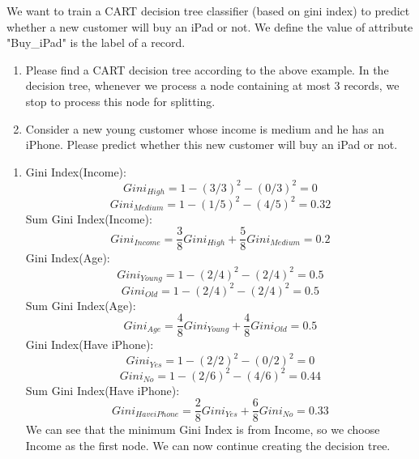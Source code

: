 \documentclass{article}
\begin{document}
We want to train a CART decision tree classifier (based on gini index) to predict whether a new customer will buy an iPad or not. We define the value of attribute "Buy\_iPad" is the label of a record.

\begin{enumerate}[label=(\roman*)]
    \item Please find a CART decision tree according to the above example. In the decision tree, whenever we process a node containing at most 3 records, we stop to process this node for splitting.
    \item Consider a new young customer whose income is medium and he has an iPhone. Please predict whether this new customer will buy an iPad or not.
\end{enumerate}

\begin{enumerate}[label=(\roman*)]
    \item 
    Gini Index(Income):
    \begin{equation}
        Gini_{High} = 1 - (3/3)^2 - (0/3)^2 = 0
    \end{equation}
    \begin{equation}
        Gini_{Medium} = 1 - (1/5)^2 - (4/5)^2 = 0.32
    \end{equation}
    Sum Gini Index(Income):
    \begin{equation}
        Gini_{Income} = \frac{3}{8}Gini_{High} + \frac{5}{8}Gini_{Medium} = 0.2
    \end{equation}
    Gini Index(Age):
    \begin{equation}
        Gini_{Young} = 1 - (2/4)^2 - (2/4)^2 = 0.5
    \end{equation}
    \begin{equation}
        Gini_{Old} = 1 - (2/4)^2 - (2/4)^2 = 0.5
    \end{equation}
    Sum Gini Index(Age):
    \begin{equation}
        Gini_{Age} = \frac{4}{8}Gini_{Young} + \frac{4}{8}Gini_{Old} = 0.5
    \end{equation}
    Gini Index(Have iPhone):
    \begin{equation}
        Gini_{Yes} = 1 - (2/2)^2 - (0/2)^2 = 0
    \end{equation}
    \begin{equation}
        Gini_{No} = 1 - (2/6)^2 - (4/6)^2 = 0.44
    \end{equation}
    Sum Gini Index(Have iPhone):
    \begin{equation}
        Gini_{Have iPhone} = \frac{2}{8}Gini_{Yes} + \frac{6}{8}Gini_{No} = 0.33
    \end{equation}
    We can see that the minimum Gini Index is from Income, so we choose Income as the first node. We can now continue creating the decision tree.


\end{enumerate}
\end{document}
